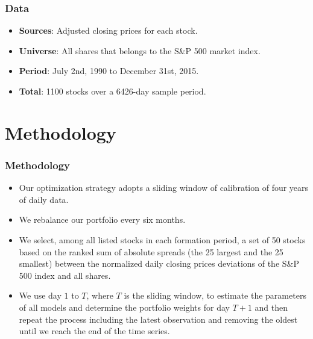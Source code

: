 \documentclass[pdf,10pt,xcolor=dvipsnames,hide notes]{beamer}
\begin{document}
\begin{frame}[label=frame2b]
\frametitle{Data}
\begin{itemize}

\setlength{\parskip}{15pt}
\justifying
	
	\item 	\textbf{Sources}: Adjusted closing prices for each stock.
	
	\item \textbf{Universe}: All shares that belongs to the S\&P 500 market index.  
	\item \textbf{Period}: July 2nd, 1990 to December 31st, 2015.
	\item \textbf{Total}: 1100 stocks over a 6426-day sample period.
	
\end{itemize}

\end{frame}

\section{Methodology}

\begin{frame}[label=frame4h]
	\frametitle{Methodology}
	
	\begin{itemize}
		\setlength{\parskip}{15pt}
		\justifying
		
		\item<1> Our optimization strategy adopts a sliding window of calibration of four years of daily data.
		
		\item<1> We rebalance our portfolio every six months.
		
		\item<2> We select, among all listed stocks in each formation period, a set of 50 stocks based on the ranked sum of absolute spreads (the 25 largest and the 25 smallest) between the normalized daily closing prices deviations of the
		S\&P 500 index and all shares.
		
		\item<2> We use day $1$ to $T$, where $T$ is the sliding window, to estimate the parameters of all models and determine the portfolio weights for day $T+1$ and then repeat the process including the latest observation and removing the oldest until we reach the end of the time series. 

		\end{itemize}
	
\end{frame}
\end{document}
